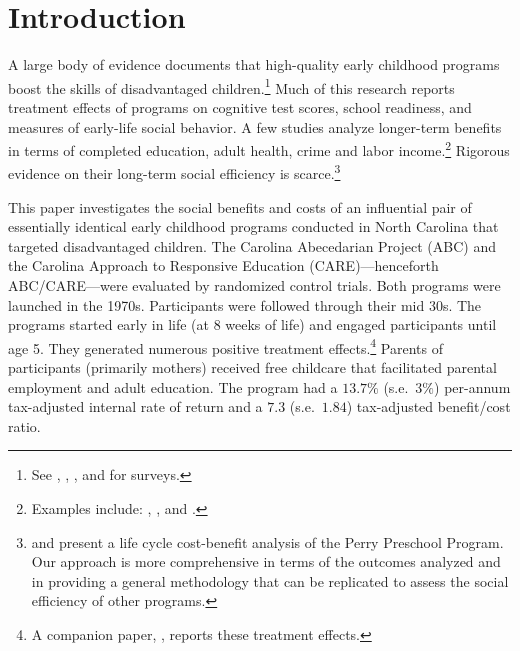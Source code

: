 \clearpage

\restoregeometry
\doublespacing
\setcounter{page}{1}

\section{Introduction}

\noindent A large body of evidence documents that high-quality early childhood programs boost the skills of disadvantaged children.\footnote{See \citet{Cunha_Heckman_ea_2006_HEE}, \citet{Almond-Currie_2011_JEP}, \citet{Duncan_Magnuson_2013_JEP}, and \citet{Elango_Hojman_etal_2016_Early-Edu} for surveys.} Much of this research reports treatment effects of programs on cognitive test scores, school readiness, and measures of early-life social behavior. A few studies analyze longer-term benefits in terms of completed education, adult health, crime and labor income.\footnote{Examples include: \citet{Heckman_Moon_etal_2010_QE}, \citet{Havnes_Mogstad_2011_AEJEP}, and \citet{Campbell_Conti_etal_2014_EarlyChildhoodInvestments}.} Rigorous evidence on their long-term social efficiency is scarce.\footnote{\citet{Belfield_Nores_etal_2006_JHR} and \citet{Heckman_Moon_etal_2010_RateofReturn} present a life cycle cost-benefit analysis of the Perry Preschool Program. Our approach is more comprehensive in terms of the outcomes analyzed and in providing a general methodology that can be replicated to assess the social efficiency of other programs.}

This paper investigates the social benefits and costs of an influential pair of essentially identical early childhood programs conducted in North Carolina that targeted disadvantaged children. The Carolina Abecedarian Project (ABC) and the Carolina Approach to Responsive Education (CARE)---henceforth ABC/CARE---were evaluated by randomized control trials. Both programs were launched in the 1970s. Participants were followed through their mid 30s. The programs started early in life (at 8 weeks of life) and engaged participants until age 5. They generated numerous positive treatment effects.\footnote{A companion paper, \citet{Garcia_Heckman_Ziff_2018_EER}, reports these treatment effects.} Parents of participants (primarily mothers) received free childcare that facilitated parental employment and adult education. The program had a $13.7\%$ (s.e.\ $3\%$) per-annum tax-adjusted internal rate of return and a $7.3$ (s.e.\ $1.84$) tax-adjusted benefit/cost ratio.

